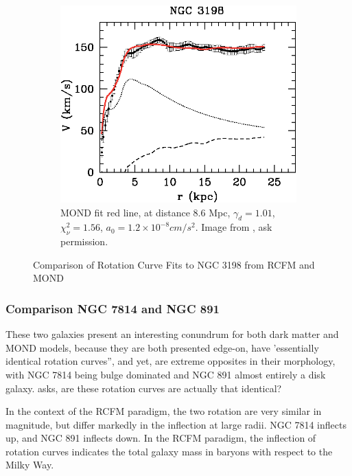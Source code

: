 \documentclass[reprint,%
 amsmath,amssymb,
 aps,
]{revtex4-1}
\begin{document}
\begin{figure}[h!]
\begin{subfigure}[c]{0.5\linewidth}
    \centering
    \includegraphics[width=0.95\linewidth]{figures/NGC3198_TAM_aa15283-10-fig7.eps} 
    \caption{ 
    MOND fit red line, at distance $8.6$ Mpc,    $\gamma_d =  1.01$, $\chi_\nu^2=1.56$, $a_0 = 1.2 \times 10^{-8} cm/ s^2$. Image from \citet{Blok1}, ask permission.  } 
    \label{fig:NGC3198MOND} 
  \end{subfigure}%
  \caption{ Comparison of Rotation Curve Fits  to NGC 3198 from RCFM and MOND }
  \label{fig1super} 
\end{figure}


    \subsubsection{Comparison NGC 7814 and NGC 891}
  
 These two galaxies present an interesting conundrum for both dark matter and MOND models, because they are both presented edge-on, have 'essentially identical rotation curves'', and yet,  are extreme opposites in their morphology,  with NGC 7814 being bulge dominated and NGC 891 almost entirely a disk galaxy. 
 \citet{Frat1} asks, are these rotation curves are actually that identical?
 
 
 
 In the context of the RCFM  paradigm, the two rotation are  very similar in magnitude,  but   differ markedly in the inflection  at large radii. 
 NGC 7814 inflects up, and  NGC 891 inflects down.
 In the RCFM paradigm, the inflection of rotation curves indicates   the total galaxy mass in baryons with respect to   the Milky Way.  
 
\end{document}

